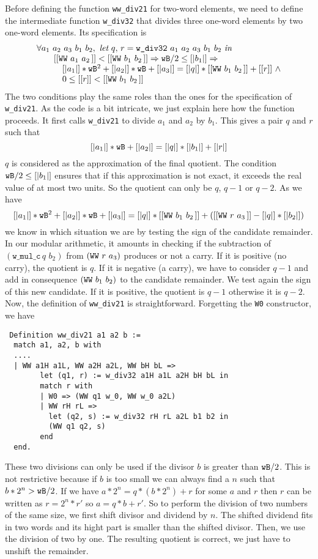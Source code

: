 Before defining the function {\tt ww\_div21} for two-word elements,
we need to define the intermediate function  {\tt w\_div32}
that divides three one-word elements by two one-word elements.
Its specification is
$$\begin{array}{l}
\forall a_1\,\, a_2\,\, a_3\,\, b_1\,\, b_2, \,\, \textit{let}\,\, q,\, r = \texttt{w\_div32}\,\, a_1\,\, a_2\,\, a_3\,\, b_1\,\, b_2\,\, \textit{in}\\
 \hskip20pt [[\texttt{WW}\,\,a_1\,\,a_2\,]] < [[\texttt{WW}\,\,b_1\,\,b_2\,]] \Rightarrow {\texttt{wB}} / 2 \le [|b_1|] \Rightarrow\\
 \hskip30pt [|a_1|] * {\texttt{wB}} ^ 2 + [|a_2|] * {\texttt{wB}}  + [|a_3|] =   [|q|] *  [[\texttt{WW}\,\,b_1\,\,b_2\,]] + [[r]] \,\,\land  \\
 \hskip30pt 0 \le [[r]] < [[\texttt{WW}\,\,b_1\,\,b_2\,]]
\end{array}
$$
The two conditions play the same roles than the ones for the specification of {\tt w\_div21}.
As the code is a bit intricate, we just explain here how the function
proceeds. It first calls {\tt w\_div21} to divide $a_1$ and $a_2$
by $b_1$. This gives a pair $q$ and $r$ such that
$$[|a_1|] * {\texttt{wB}} + [|a_2|] = [|q|] * [|b_1|] + [|r|]$$
$q$ is considered as the approximation of the final quotient.
The condition ${\texttt{wB}} / 2 \le [|b_1|]$ ensures that if this approximation
is not exact, it exceeds the real value of at most two units. So the quotient 
can only be $q$, $q - 1$ or $q - 2$. 
As we have 
$$[|a_1|] *  {\texttt{wB}} ^ 2  + [|a_2|] * {\texttt{wB}} + [|a_3|] = [|q|] * [[\texttt{WW}\,\,b_1\,\,b_2\,]] + ([[\texttt{WW}\,\,r\,\,a_3\,]] - [|q|] * [|b_2|])$$
we know in which situation we are by testing the sign of the candidate
remainder.
In our modular arithmetic, it amounts in checking if the subtraction of
$(\texttt{w\_mul\_c}\, q\,\, b_2)$ from $(\texttt{WW}\,\,r\,\,a_3\,\!)$
produces or not a carry.  
If it is positive (no carry), the quotient is $q$. If it is negative (a carry), we
have to consider $q - 1$ and add in consequence $(\texttt{WW}\,\,b_1\,\,b_2\,\!)$ to the candidate remainder.
We test again the sign of this new candidate. If it is positive, the quotient is $q - 1$
otherwise it is $q - 2$.
Now, the definition of {\tt ww\_div21} is straightforward. Forgetting the {\tt W0}
constructor, we have
\begin{verbatim} 
 Definition ww_div21 a1 a2 b :=
  match a1, a2, b with
  ....  
  | WW a1H a1L, WW a2H a2L, WW bH bL =>
        let (q1, r) := w_div32 a1H a1L a2H bH bL in
        match r with
        | W0 => (WW q1 w_0, WW w_0 a2L)
        | WW rH rL =>
          let (q2, s) := w_div32 rH rL a2L b1 b2 in
          (WW q1 q2, s)
        end
  end.
\end{verbatim}
These two divisions can only be used if the divisor $b$ is greater than ${\texttt{wB}}/2$. This is not restrictive
because if $b$ is too small we can always find a $n$ such that $b* 2 ^n > {\texttt{wB}}/2$. If we have $a * 2 ^ n  =  q  * (b * 2 ^ n) + r$ for some $a$ and $r$ then $r$ can be written as $r = 2^n * r'$ so
$a = q * b + r'$. So to perform the division of two numbers of the same size, we first shift
divisor and dividend by $n$. The shifted dividend fits in two words and its hight part is smaller
than the shifted divisor. Then, we use the division of two by one. The resulting
quotient is correct, we just have to unshift the remainder.

